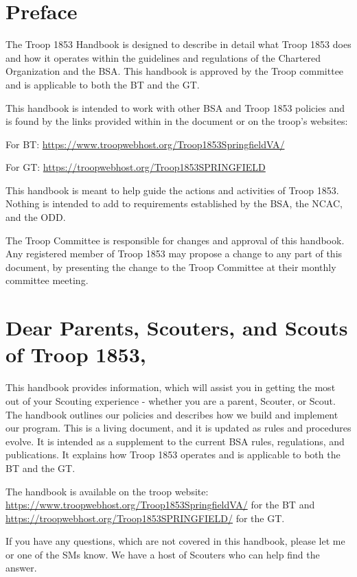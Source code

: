 \documentclass{ltxguide}
\begin{document}
\section*{Preface}
The Troop 1853 Handbook is designed to describe in detail what Troop 1853 does and how it operates within the guidelines and regulations of the Chartered Organization and the \ac{BSA}. This handbook is approved by the Troop committee and is applicable to both the \ac{BT} and the \ac{GT}.

This handbook is intended to work with other \ac{BSA} and Troop 1853 policies and is found by the links provided within in the document or on the troop's websites: 

For \ac{BT}: \url{https://www.troopwebhost.org/Troop1853SpringfieldVA/}

For \ac{GT}: \url{https://troopwebhost.org/Troop1853SPRINGFIELD}

This handbook is meant to help guide the actions and activities of Troop 1853. Nothing is intended to add to requirements established by the \ac{BSA}, the \ac{NCAC}, and the \ac{ODD}.

The Troop Committee is responsible for changes and approval of this handbook. Any registered member of Troop 1853 may propose a change to any part of this document, by presenting the change to the Troop Committee at their monthly committee meeting.

\newpage
\section*{Dear Parents, Scouters, and Scouts of Troop 1853,}

This handbook provides information, which will assist you in getting the most out of your Scouting experience - whether you are a parent, Scouter, or Scout. The handbook outlines our policies and describes how we build and implement our program. This is a living document, and it is updated as rules and procedures evolve. It is intended as a supplement to the current \ac{BSA} rules, regulations, and publications. It explains how Troop 1853 operates and is applicable to both the \ac{BT} and the \ac{GT}.
 
The handbook is available on the troop website:
\url{https://www.troopwebhost.org/Troop1853SpringfieldVA/} for the \ac{BT} and \url{https://troopwebhost.org/Troop1853SPRINGFIELD/} for the \ac{GT}. 

If you have any questions, which are not covered in this handbook, please let me or one of the \acp{SM} know. We have a host of Scouters who can help find the answer.
\end{document}
